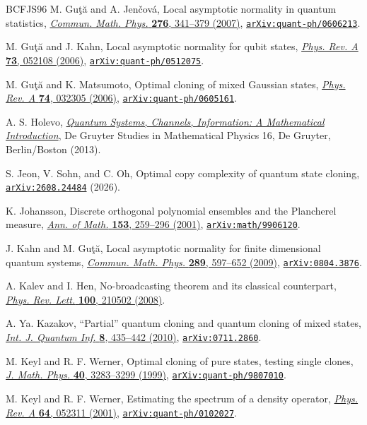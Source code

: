 \documentclass[11pt]{article}
\theoremstyle{remark}
\theoremstyle{plain}
\newcommand{\doi}[2]{\href{https://doi.org/#1}{#2}}
\newcommand{\arxiv}[1]{\href{https://arxiv.org/abs/#1}{\texttt{arXiv:#1}}}
\begin{document}
\begin{thebibliography}{BCFJS96}
M. Gu{\c t}{\u a} and A. Jen{\v c}ov\'a,
Local asymptotic normality in quantum statistics,
\doi{10.1007/s00220-007-0340-1}{\emph{Commun. Math. Phys.} \textbf{276}, 341--379 (2007)},
\arxiv{quant-ph/0606213}.

M. Gu{\c t}{\u a} and J. Kahn,
Local asymptotic normality for qubit states,
\doi{10.1103/PhysRevA.73.052108}{\emph{Phys. Rev. A} \textbf{73}, 052108 (2006)},
\arxiv{quant-ph/0512075}.

M. Gu{\c t}{\u a} and K. Matsumoto,
Optimal cloning of mixed Gaussian states,
\doi{10.1103/PhysRevA.74.032305}{\emph{Phys. Rev. A} \textbf{74}, 032305 (2006)},
\arxiv{quant-ph/0605161}.

A. S. Holevo,
\doi{10.1515/9783110273403}{\emph{Quantum Systems, Channels, Information:
A Mathematical Introduction}},
De Gruyter Studies in Mathematical Physics 16, De Gruyter, Berlin/Boston (2013).

S. Jeon, V. Sohn, and C. Oh,
Optimal copy complexity of quantum state cloning,
\arxiv{2608.24484} (2026).

K. Johansson,
Discrete orthogonal polynomial ensembles and the Plancherel measure,
\doi{10.2307/2661375}{\emph{Ann. of Math.} \textbf{153}, 259--296 (2001)},
\arxiv{math/9906120}.

J. Kahn and M. Gu{\c t}{\u a},
Local asymptotic normality for finite dimensional quantum systems,
\doi{10.1007/s00220-009-0787-3}{\emph{Commun. Math. Phys.} \textbf{289}, 597--652 (2009)},
\arxiv{0804.3876}.

A. Kalev and I. Hen,
No-broadcasting theorem and its classical counterpart,
\doi{10.1103/PhysRevLett.100.210502}{\emph{Phys. Rev. Lett.} \textbf{100},
210502 (2008)}.

A. Ya. Kazakov,
``Partial'' quantum cloning and quantum cloning of mixed states,
\doi{10.1142/S0219749910006186}{\emph{Int. J. Quantum Inf.}
\textbf{8}, 435--442 (2010)},
\arxiv{0711.2860}.

M. Keyl and R. F. Werner,
Optimal cloning of pure states, testing single clones,
\doi{10.1063/1.532887}{\emph{J. Math. Phys.} \textbf{40}, 3283--3299 (1999)},
\arxiv{quant-ph/9807010}.

M. Keyl and R. F. Werner,
Estimating the spectrum of a density operator,
\doi{10.1103/PhysRevA.64.052311}{\emph{Phys. Rev. A} \textbf{64}, 052311 (2001)},
\arxiv{quant-ph/0102027}.


\end{thebibliography}
\end{document}
